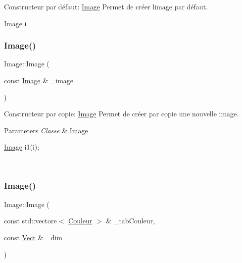 Constructeur par défaut\+: \hyperlink{classImage}{Image} Permet de créer l\textquotesingle{}image par défaut. 


\begin{DoxyCode}
\hyperlink{classImage}{Image} i
\end{DoxyCode}
 \mbox{\label{classImage_a18dba28d7d81f51cabf37e0044bd2d6c}} 
\subsubsection{\texorpdfstring{Image()}{Image()}\hspace{0.1cm}{\footnotesize\ttfamily [2/4]}}
{\footnotesize\ttfamily Image\+::\+Image (\begin{DoxyParamCaption}\item[{const \hyperlink{classImage}{Image} \&}]{\+\_\+image }\end{DoxyParamCaption})}



Constructeur par copie\+: \hyperlink{classImage}{Image} Permet de créer par copie une nouvelle image. 


\begin{DoxyParams}{Parameters}
{\em Classe} & \hyperlink{classImage}{Image} 
\begin{DoxyCode}
\hyperlink{classImage}{Image} i1(i);
\end{DoxyCode}
 \\
\hline
\end{DoxyParams}
\mbox{\label{classImage_ae8b4bc2d9cf6b0591f9c16829e0b1dad}} 
\subsubsection{\texorpdfstring{Image()}{Image()}\hspace{0.1cm}{\footnotesize\ttfamily [3/4]}}
{\footnotesize\ttfamily Image\+::\+Image (\begin{DoxyParamCaption}\item[{const std\+::vectore$<$ \hyperlink{classCouleur}{Couleur} $>$ \&}]{\+\_\+tab\+Couleur,  }\item[{const \hyperlink{classVect}{Vect} \&}]{\+\_\+dim }\end{DoxyParamCaption})}



